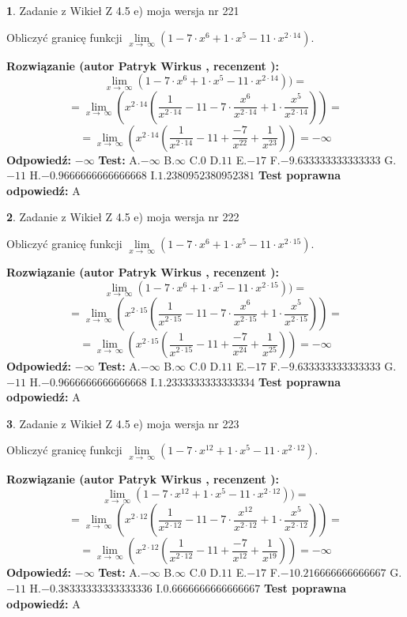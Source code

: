 \documentclass[12pt, a4paper]{article}
\theoremstyle{definition} %
\newtheorem{zad}{}
\newcommand{\zadStart}[1]{\begin{zad}#1\newline}
\newcommand{\zadStop}{\end{zad}}
\newcommand{\rozwStart}[2]{\noindent \textbf{Rozwiązanie (autor #1 , recenzent #2): }\newline}
\newcommand{\rozwStop}{\newline}
\newcommand{\odpStart}{\noindent \textbf{Odpowiedź:}\newline}
\newcommand{\odpStop}{\newline}
\newcommand{\testStart}{\noindent \textbf{Test:}\newline}
\newcommand{\testStop}{\newline}
\newcommand{\kluczStart}{\noindent \textbf{Test poprawna odpowiedź:}\newline}
\newcommand{\kluczStop}{\newline}
\begin{document}
\zadStart{Zadanie z Wikieł Z 4.5 e) moja wersja nr 221}


Obliczyć granicę funkcji  $\lim\limits_{x\to\ \infty}(1 - 7 \cdot x^{6}+1 \cdot x^{5}- 11 \cdot x^{2\cdot14})$.
\zadStop
\rozwStart{Patryk Wirkus}{}
$$\lim\limits_{x\to\ \infty}(1 - 7 \cdot x^{6}+1 \cdot x^{5}- 11 \cdot x^{2\cdot14}))=$$
$$=\lim\limits_{x\to\ \infty}(x^{2\cdot14}(\frac{1}{x^{2\cdot14}}-11 -7 \cdot \frac{x^{6}}{x^{2\cdot14}}+1 \cdot \frac{x^{5}}{x^{2\cdot14}}))=$$
$$=\lim\limits_{x\to\ \infty}(x^{2\cdot14}(\frac{1}{x^{2\cdot14}}-11 + \frac{-7}{x^{22}}+ \frac{1}{x^{23}}))=-\infty$$
\rozwStop
\odpStart
$-\infty$
\odpStop
\testStart
A.$-\infty$ B.$\infty$ C.$0$ D.$11$ E.$-17$
F.$-9.633333333333333$ G.$-11$
H.$-0.9666666666666668$
I.$1.2380952380952381$
\testStop
\kluczStart
A
\kluczStop



\zadStart{Zadanie z Wikieł Z 4.5 e) moja wersja nr 222}


Obliczyć granicę funkcji  $\lim\limits_{x\to\ \infty}(1 - 7 \cdot x^{6}+1 \cdot x^{5}- 11 \cdot x^{2\cdot15})$.
\zadStop
\rozwStart{Patryk Wirkus}{}
$$\lim\limits_{x\to\ \infty}(1 - 7 \cdot x^{6}+1 \cdot x^{5}- 11 \cdot x^{2\cdot15}))=$$
$$=\lim\limits_{x\to\ \infty}(x^{2\cdot15}(\frac{1}{x^{2\cdot15}}-11 -7 \cdot \frac{x^{6}}{x^{2\cdot15}}+1 \cdot \frac{x^{5}}{x^{2\cdot15}}))=$$
$$=\lim\limits_{x\to\ \infty}(x^{2\cdot15}(\frac{1}{x^{2\cdot15}}-11 + \frac{-7}{x^{24}}+ \frac{1}{x^{25}}))=-\infty$$
\rozwStop
\odpStart
$-\infty$
\odpStop
\testStart
A.$-\infty$ B.$\infty$ C.$0$ D.$11$ E.$-17$
F.$-9.633333333333333$ G.$-11$
H.$-0.9666666666666668$
I.$1.2333333333333334$
\testStop
\kluczStart
A
\kluczStop



\zadStart{Zadanie z Wikieł Z 4.5 e) moja wersja nr 223}


Obliczyć granicę funkcji  $\lim\limits_{x\to\ \infty}(1 - 7 \cdot x^{12}+1 \cdot x^{5}- 11 \cdot x^{2\cdot12})$.
\zadStop
\rozwStart{Patryk Wirkus}{}
$$\lim\limits_{x\to\ \infty}(1 - 7 \cdot x^{12}+1 \cdot x^{5}- 11 \cdot x^{2\cdot12}))=$$
$$=\lim\limits_{x\to\ \infty}(x^{2\cdot12}(\frac{1}{x^{2\cdot12}}-11 -7 \cdot \frac{x^{12}}{x^{2\cdot12}}+1 \cdot \frac{x^{5}}{x^{2\cdot12}}))=$$
$$=\lim\limits_{x\to\ \infty}(x^{2\cdot12}(\frac{1}{x^{2\cdot12}}-11 + \frac{-7}{x^{12}}+ \frac{1}{x^{19}}))=-\infty$$
\rozwStop
\odpStart
$-\infty$
\odpStop
\testStart
A.$-\infty$ B.$\infty$ C.$0$ D.$11$ E.$-17$
F.$-10.216666666666667$ G.$-11$
H.$-0.38333333333333336$
I.$0.6666666666666667$
\testStop
\kluczStart
A
\kluczStop
\end{document}
